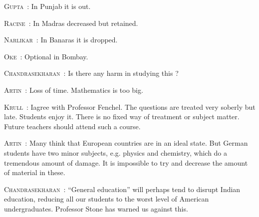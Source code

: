 \smallskip
\noindent
\textsc{Gupta}~: In Punjab it is out.

\smallskip
\noindent
\textsc{Racine}~: In Madras decreased but retained.

\smallskip
\noindent
\textsc{Narlikar}~: In Banaras it is dropped.

\smallskip
\noindent
\textsc{Oke}~: Optional in Bombay.

\smallskip
\noindent
\textsc{Chandrasekharan}~: Is there any harm in studying this ?

\smallskip
\noindent
\textsc{Artin}~: Loss of time. Mathematics is too big.

\smallskip
\noindent
\textsc{Krull}~: I\pageoriginale agree with Professor Fenchel. The questions are treated very soberly but late. Students enjoy it. There is no fixed way of treatment or subject matter. Future teachers should attend such a course.

\smallskip
\noindent
\textsc{Artin}~: Many think that European countries are in an ideal state. But German students have two minor subjects, e.g. physics and chemistry, which do a tremendous amount of damage. It is impossible to try and decrease the amount of material in these.

\smallskip
\noindent
\textsc{Chandrasekharan}~: ``General education'' will perhaps tend to disrupt Indian education, reducing all our students to the worst level of American undergraduates. Professor Stone has warned us against this.


